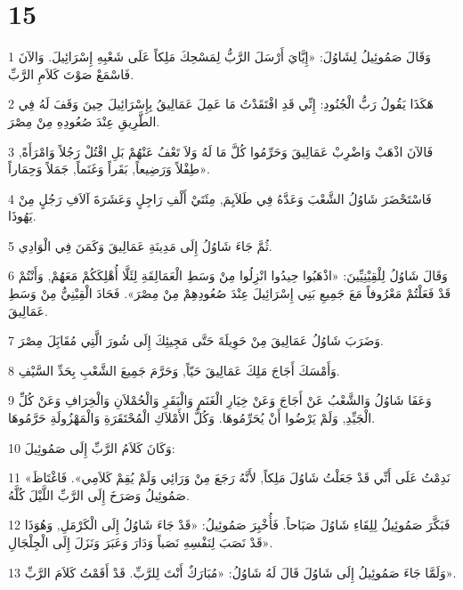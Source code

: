 \chapter{15}

\par 1 وَقَالَ صَمُوئِيلُ لِشَاوُلَ: «إِيَّايَ أَرْسَلَ الرَّبُّ لِمَسْحِكَ مَلِكاً عَلَى شَعْبِهِ إِسْرَائِيلَ. وَالآنَ فَاسْمَعْ صَوْتَ كَلاَمِ الرَّبِّ.
\par 2 هَكَذَا يَقُولُ رَبُّ الْجُنُودِ: إِنِّي قَدِ افْتَقَدْتُ مَا عَمِلَ عَمَالِيقُ بِإِسْرَائِيلَ حِينَ وَقَفَ لَهُ فِي الطَّرِيقِ عِنْدَ صُعُودِهِ مِنْ مِصْرَ.
\par 3 فَالآنَ اذْهَبْ وَاضْرِبْ عَمَالِيقَ وَحَرِّمُوا كُلَّ مَا لَهُ وَلاَ تَعْفُ عَنْهُمْ بَلِ اقْتُلْ رَجُلاً وَامْرَأَةً, طِفْلاً وَرَضِيعاً, بَقَراً وَغَنَماً, جَمَلاً وَحِمَاراً».
\par 4 فَاسْتَحْضَرَ شَاوُلُ الشَّعْبَ وَعَدَّهُ فِي طَلاَيِمَ, مِئَتَيْ أَلْفِ رَاجِلٍ وَعَشَرَةَ آلاَفِ رَجُلٍ مِنْ يَهُوذَا.
\par 5 ثُمَّ جَاءَ شَاوُلُ إِلَى مَدِينَةِ عَمَالِيقَ وَكَمَنَ فِي الْوَادِي.
\par 6 وَقَالَ شَاوُلُ لِلْقِيْنِيِّينَ: «اذْهَبُوا حِيدُوا انْزِلُوا مِنْ وَسَطِ الْعَمَالِقَةِ لِئَلَّا أُهْلِكَكُمْ مَعَهُمْ, وَأَنْتُمْ قَدْ فَعَلْتُمْ مَعْرُوفاً مَعَ جَمِيعِ بَنِي إِسْرَائِيلَ عِنْدَ صُعُودِهِمْ مِنْ مِصْرَ». فَحَادَ الْقِيْنِيُّ مِنْ وَسَطِ عَمَالِيقَ.
\par 7 وَضَرَبَ شَاوُلُ عَمَالِيقَ مِنْ حَوِيلَةَ حَتَّى مَجِيئِكَ إِلَى شُورَ الَّتِي مُقَابَِلَ مِصْرَ.
\par 8 وَأَمْسَكَ أَجَاجَ مَلِكَ عَمَالِيقَ حَيّاً, وَحَرَّمَ جَمِيعَ الشَّعْبِ بِحَدِّ السَّيْفِ.
\par 9 وَعَفَا شَاوُلُ وَالشَّعْبُ عَنْ أَجَاجَ وَعَنْ خِيَارِ الْغَنَمِ وَالْبَقَرِ وَالْحُمْلاَنِ وَالْخِرَافِ وَعَنْ كُلِّ الْجَيِّدِ, وَلَمْ يَرْضُوا أَنْ يُحَرِّمُوهَا. وَكُلُّ الأَمْلاَكِ الْمُحْتَقَرَةِ وَالْمَهْزُولَةِ حَرَّمُوهَا.
\par 10 وَكَانَ كَلاَمُ الرَّبِّ إِلَى صَمُوئِيلَ:
\par 11 «نَدِمْتُ عَلَى أَنِّي قَدْ جَعَلْتُ شَاوُلَ مَلِكاً, لأَنَّهُ رَجَعَ مِنْ وَرَائِي وَلَمْ يُقِمْ كَلاَمِي». فَاغْتَاظَ صَمُوئِيلُ وَصَرَخَ إِلَى الرَّبِّ اللَّيْلَ كُلَّهُ.
\par 12 فَبَكَّرَ صَمُوئِيلُ لِلِقَاءِ شَاوُلَ صَبَاحاً. فَأُخْبِرَ صَمُوئِيلُ: «قَدْ جَاءَ شَاوُلُ إِلَى الْكَرْمَلِ, وَهُوَذَا قَدْ نَصَبَ لِنَفْسِهِ نَصَباً وَدَارَ وَعَبَرَ وَنَزَلَ إِلَى الْجِلْجَالِ».
\par 13 وَلَمَّا جَاءَ صَمُوئِيلُ إِلَى شَاوُلَ قَالَ لَهُ شَاوُلُ: «مُبَارَكٌ أَنْتَ لِلرَّبِّ. قَدْ أَقَمْتُ كَلاَمَ الرَّبِّ».
